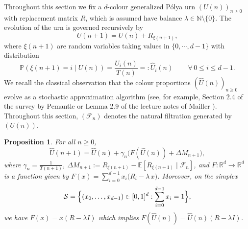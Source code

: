 \documentclass[12pt]{amsart}
\newtheorem{proposition}[theorem]{Proposition}
\theoremstyle{definition}
\theoremstyle{remark}
\newcommand{\NN}{\mathbb{N}}
\newcommand{\RR}{\mathbb{R}}
\begin{document}
Throughout this section we fix a $d$-colour generalized P\'olya urn $(U(n))_{n\geq 0}$ with replacement matrix $R$, which is assumed have balance $\lambda \in \NN\setminus\{0\}$. The evolution of the urn is governed recursively by
\[
U(n+1)=U(n) + R_{\xi(n+1)},
\]
where $\xi(n+1)$ are random variables taking values in $\{0, \cdots, d-1\}$ with distribution
\[
\mathbb{P}\!\left(\xi(n+1) = i \mid U(n)\right)
    = \frac{U_i(n)}{T(n)}=:\hat{U}_i(n) \,
    \qquad \forall\, 0 \leq i \leq d-1.
\]
We recall the classical observation that the colour proportions $(\hat{U}(n))_{n\geq 0}$ evolve as a stochastic approximation algorithm (see, for example, Section 2.4 of the survey by Pemantle \cite{pemantle2007survey} or Lemma 2.9 of the lecture notes of Mailler \cite{mailler:urn:notes}). Throughout this section, $(\mathcal{F}_n)$ denotes the natural filtration generated by $(U(n))$.
\begin{proposition}\label{prop:urn:SA}
For all $n \geq 0$,
\[
    \hat{U}(n+1) = \hat{U}(n) + \gamma_n\bigl(F(\hat{U}(n)) + \Delta M_{n+1}\bigr),
\]
where $\gamma_n = \frac{1}{T(n+1)}$, $ \Delta M_{n+1}
    := R_{\xi(n+1)} 
      - \mathbb{E}\left[R_{\xi(n+1)} \mid \mathcal{F}_n\right]$, and  $F: \RR^d \to \RR^d$ is a function given by $F(x) = \sum_{i=0}^{d-1} x_i\bigl(R_i - \lambda\, x\bigr)$. Moreover, on the simplex
\[
    \mathcal{S} = \Bigl\{(x_0, \ldots, x_{d-1}) \in [0,1]^d : \sum_{i=0}^{d-1} x_i = 1\Bigr\},
\]
we have $F(x)= x(R-\lambda I)$ which implies $F(\hat{U}(n)) = \hat{U}(n)(R-\lambda I)$.

\end{proposition}
 
\end{document}
